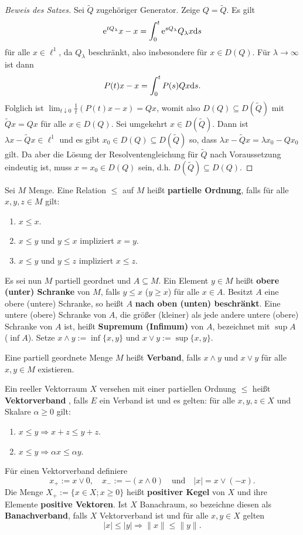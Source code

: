 \begin{proof}[Beweis des Satzes]
Sei $\tilde Q$ zugehöriger Generator. Zeige $Q=\tilde Q$. Es gilt $$\text e^{t Q_\lambda}x-x=\int_0^t \text e^{s Q_\lambda}Q_\lambda x\text ds$$ für alle $x\in\ell^1$, da $Q_\lambda$ beschränkt, also insbesondere für $x\in D(Q)$. Für $\lambda\to\infty$ ist dann $$P(t)x-x=\int_0^t P(s)Qx\text ds.$$ Folglich ist $\lim_{t\downarrow 0}\frac{1}{t}(P(t)x-x)=Qx$, womit also $D( Q)\subseteq D(\tilde Q)$ mit $\tilde Qx=Qx$ für alle $x\in D(Q)$. Sei umgekehrt $x\in D(\tilde Q)$. Dann ist $\lambda x- \tilde Qx\in \ell^1$ und es gibt $x_0\in D(Q)\subseteq D(\tilde Q)$ so, dass $\lambda x- \tilde Qx=\lambda x_0-Qx_0$ gilt. Da aber die Lösung der Resolventengleichung für $\tilde Q$ nach Voraussetzung eindeutig ist, muss $x=x_0\in D(Q)$ sein, d.h. $D(\tilde Q)\subseteq D(Q)$.  
\end{proof}



\begin{defi}[Banachverband]
  	Sei $M$ Menge. Eine Relation $\leq $ auf $M$ heißt \textbf{partielle Ordnung}, falls für alle $x,y,z\in M$ gilt:
    \begin{enumerate}
    \item  $x\leq x$.
    \item $x\leq y$ und $y\leq x$ impliziert $x=y$.
    \item $x\leq y$ und $y\leq z$ impliziert $x\leq z$. 
    \end{enumerate}
Es sei nun $M$ partiell geordnet und $A\subseteq M$. Ein Element $y\in M$ heißt \textbf{obere (unter) Schranke} von $M$, falls $y\leq x$ ($y\geq x$) für alle $x\in A$. Besitzt $A$ eine obere  (untere) Schranke, so  heißt $A$ \textbf{nach oben (unten) beschränkt}. Eine untere (obere) Schranke von $A$, die größer (kleiner) als jede andere untere (obere) Schranke von $A$ ist, heißt \textbf{Supremum (Infimum)} von $A$, bezeichnet mit $\sup A$ ($\inf A$). Setze $x\wedge y:=\inf\{x,y\}$ und $x\vee y:=\sup\{x,y\}$. 
\par Eine partiell geordnete Menge $M$ heißt \textbf{Verband}, falls $x\wedge y$ und $x\vee y$ für alle $x,y\in M$ existieren.
\par Ein reeller Vektorraum $X$ versehen mit einer partiellen Ordnung $\leq $ heißt \textbf{Vektorverband} , falls $E$ ein Verband ist und es gelten: für alle $x,y,z\in X$ und Skalare $\alpha\geq0$ gilt:
  \begin{enumerate}
    \item $x\leq y\Rightarrow x+z\leq y+z$.
    \item $x\leq y \Rightarrow \alpha x\leq \alpha y$. 
  \end{enumerate}
Für einen Vektorverband definiere $$x_+ :=x\vee 0,\quad x_-:=-(x\wedge 0)\quad\text{und}\quad |x|=x\vee(-x).$$
Die Menge $X_+:=\{x\in X; x\geq0\}$ heißt \textbf{positiver Kegel} von $X$ und ihre Elemente \textbf{positive Vektoren}.
Ist $X$ Banachraum, so bezeichne diesen als \textbf{Banachverband}, falls $X$ Vektorverband ist und für alle $x,y\in X$ gelten $$|x|\leq |y|\Rightarrow \|x\|\leq \|y\|.$$
\end{defi}

